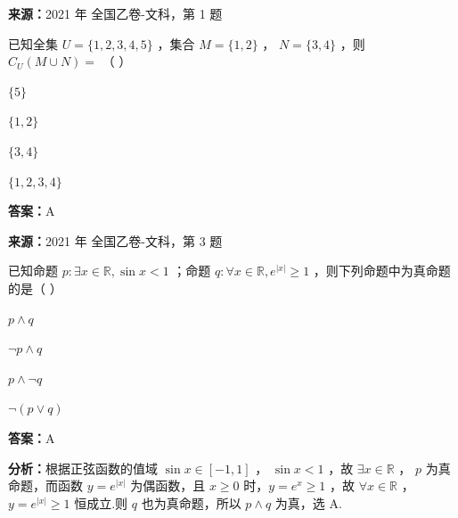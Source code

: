 \begin{question}[points=5]
\textbf{来源：}2021 年 全国乙卷-文科，第 1 题\par
已知全集 $U = \{1,2,3,4,5\}$ ，集合 $M = \{1,2\}$ ， $N = \{3,4\}$ ，则 $C_U(M \cup N) =$ （ ）
\begin{choices}
  \item $\{5\}$
  \item $\{1,2\}$
  \item $\{3,4\}$
  \item $\{1,2,3,4\}$
\end{choices}
\begin{solution}
\textbf{答案：}A
\end{solution}
\end{question}

\begin{question}[points=5]
\textbf{来源：}2021 年 全国乙卷-文科，第 3 题\par
已知命题 $p: \exists x \in \mathbb{R}, \sin x < 1$ ；命题 $q: \forall x \in \mathbb{R}, e^{|x|} \ge 1$ ，则下列命题中为真命题的是（ ）
\begin{choices}
  \item $p \land q$
  \item $\neg p \land q$
  \item $p \land \neg q$
  \item $\neg(p \lor q)$
\end{choices}
\begin{solution}
\textbf{答案：}A

\textbf{分析：}根据正弦函数的值域 $\sin x \in [-1,1]$ ， $\sin x < 1$ ，故 $\exists x \in \mathbb{R}$ ， $p$ 为真命题，而函数 $y = e^{|x|}$ 为偶函数，且 $x \ge 0$ 时，$y = e^x \ge 1$ ，故 $\forall x \in \mathbb{R}$ ， $y = e^{|x|} \ge 1$ 恒成立.则 $q$ 也为真命题，所以 $p \land q$ 为真，选 A.
\end{solution}
\end{question}

